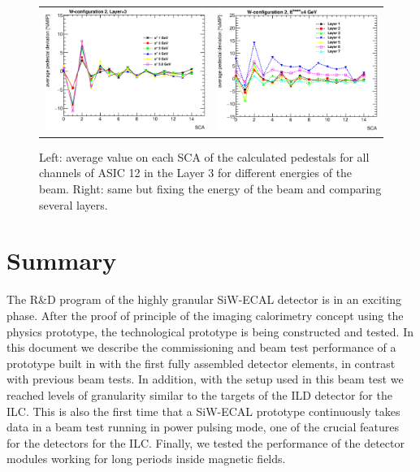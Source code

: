\documentclass[a4paper,11pt]{article}
\begin{document}
\begin{figure}[!t]
  \centering 
    \begin{tabular}{ll}
      \includegraphics[width=2.8in]{../figs/pedestal/pedestal_deviation_layer3.eps} & \includegraphics[width=2.8in]{../figs/pedestal/pedestal_deviation_4GeV.eps} \\
    \end{tabular}
    \caption{Left: average value on each SCA of the calculated pedestals for all channels of ASIC 12 in the Layer 3 for different energies of the beam. Right: same but fixing the energy of the beam and comparing several layers.}
\label{pedestal_shower_2}
\end{figure}


\section{Summary}
\label{sec:summary}

The R\&D program of the highly granular SiW-ECAL detector is in an exciting phase. 
After the proof of principle of the imaging calorimetry concept using the physics prototype, the 
technological prototype is being constructed and tested. In this document we describe the commissioning and
beam test performance of a prototype built in with the first fully assembled
detector elements, in contrast with previous beam tests. In addition,
with the setup used in this beam test we reached levels of granularity
similar to the targets of the ILD detector for the ILC. This is also the first time
that a SiW-ECAL prototype continuously takes data in a beam test running in power pulsing mode, one of the crucial
features for the detectors for the ILC. Finally, we tested the performance of the detector
modules working for long periods inside magnetic fields.
\end{document}
